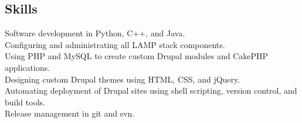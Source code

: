 \documentclass[margin,line]{resume}
\begin{document}
\begin{resume}

    \section{\mysidestyle Skills} 

    Software development in Python, C++, and Java.\vspace{1mm}\\%
    Configuring and administrating all LAMP stack components.\vspace{1mm}\\%
    Using PHP and MySQL to create custom Drupal modules and CakePHP applications.\vspace{1mm}\\%
    Designing custom Drupal themes using HTML, CSS, and jQuery.\vspace{1mm}\\%
    Automating deployment of Drupal sites using shell scripting, version control, and build tools.\vspace{1mm}\\%
    Release management in git and svn.\vspace{1mm}\\%

\end{resume}
\end{document}
